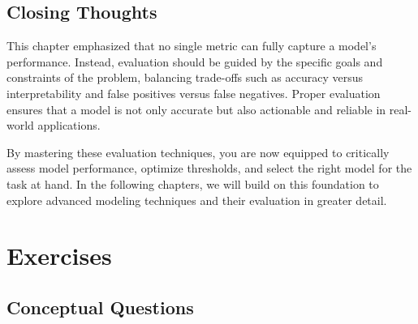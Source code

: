 \documentclass[
  11pt,
]{book}
\theoremstyle{definition}
\theoremstyle{definition}
\theoremstyle{definition}
\theoremstyle{definition}
\theoremstyle{remark}
\begin{document}
\subsection*{Closing Thoughts}\label{closing-thoughts}


This chapter emphasized that no single metric can fully capture a model's performance. Instead, evaluation should be guided by the specific goals and constraints of the problem, balancing trade-offs such as accuracy versus interpretability and false positives versus false negatives. Proper evaluation ensures that a model is not only accurate but also actionable and reliable in real-world applications.

By mastering these evaluation techniques, you are now equipped to critically assess model performance, optimize thresholds, and select the right model for the task at hand. In the following chapters, we will build on this foundation to explore advanced modeling techniques and their evaluation in greater detail.

\section{Exercises}\label{exercises-6}

\subsection*{Conceptual Questions}\label{conceptual-questions-4}
\end{document}
